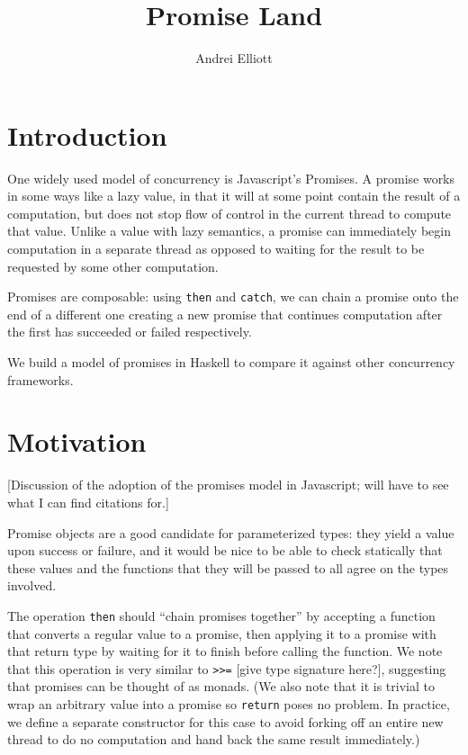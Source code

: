 \documentclass[12pt, english, letterpaper]{kuthesis}
\title{Promise Land}
\author{Andrei Elliott}
\newcommand{\lit}[1]{\texttt{#1}}
\begin{document}
\begin{romanpages}
  \maketitle
\end{romanpages}

\chapter{Introduction}
One widely used model of concurrency is Javascript's Promises.  A promise works in some ways like a lazy value, in that it will at some point contain the result of a computation, but does not stop flow of control in the current thread to compute that value.  Unlike a value with lazy semantics, a promise can immediately begin computation in a separate thread as opposed to waiting for the result to be requested by some other computation.

Promises are composable: using \lit{then} and \lit{catch}, we can chain a promise onto the end of a different one creating a new promise that continues computation after the first has succeeded or failed respectively.

We build a model of promises in Haskell to compare it against other concurrency frameworks.
\chapter{Motivation}
[Discussion of the adoption of the promises model in Javascript; will have to see what I can find citations for.]

Promise objects are a good candidate for parameterized types: they yield a value upon success or failure, and it would be nice to be able to check statically that these values and the functions that they will be passed to all agree on the types involved.

The operation \lit{then} should ``chain promises together'' by accepting a function that converts a regular value to a promise, then applying it to a promise with that return type by waiting for it to finish before calling the function.  We note that this operation is very similar to \lit{>>=} [give type signature here?], suggesting that promises can be thought of as monads.  (We also note that it is trivial to wrap an arbitrary value into a promise so \lit{return} poses no problem.  In practice, we define a separate constructor for this case to avoid forking off an entire new thread to do no computation and hand back the same result immediately.)
\end{document}

